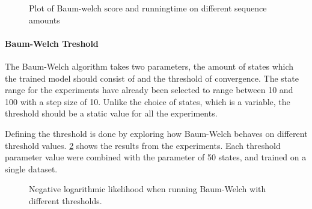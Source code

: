 \begin{figure}
	\centering
	\begin{subfigure}[b]{0.5\textwidth}
        \end{subfigure}%
		\begin{subfigure}[b]{0.5\textwidth}
	\end{subfigure}
  	\caption{Plot of Baum-welch score and runningtime on different sequence amounts}\label{fig:sequences}
\end{figure}


\paragraph{Baum-Welch Treshold}
The Baum-Welch algorithm takes two parameters, the amount of states which the trained model should consist of and the threshold of convergence. The state range for the experiments have already been selected to range between 10 and 100 with a step size of 10. Unlike the choice of states, which is a variable, the threshold should be a static value for all the experiments.

Defining the threshold is done by exploring how Baum-Welch behaves on different threshold values. \ref{fig:threshold} shows the results from the experiments. Each threshold parameter value were combined with the parameter of 50 states, and trained on a single dataset.

\begin{figure}
\centering
\caption{Negative logarithmic likelihood when running Baum-Welch with different thresholds.}
\label{fig:threshold}
\end{figure}

